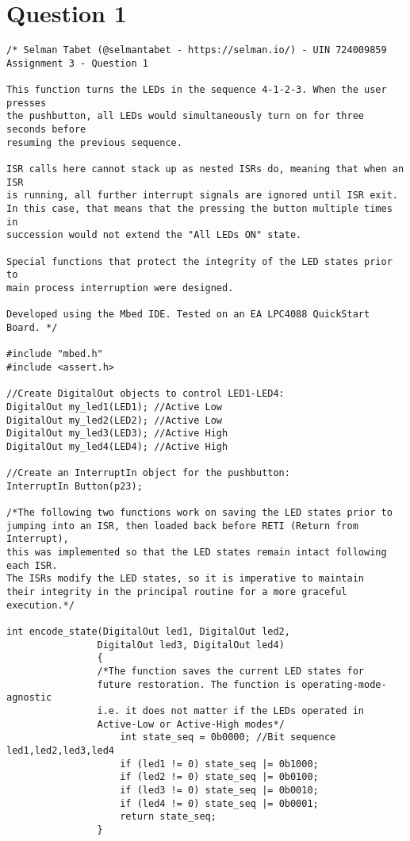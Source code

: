 \documentclass{article}
\begin{document}
\section*{Question 1}
\begin{verbatim}
/* Selman Tabet (@selmantabet - https://selman.io/) - UIN 724009859
Assignment 3 - Question 1

This function turns the LEDs in the sequence 4-1-2-3. When the user presses
the pushbutton, all LEDs would simultaneously turn on for three seconds before
resuming the previous sequence.

ISR calls here cannot stack up as nested ISRs do, meaning that when an ISR
is running, all further interrupt signals are ignored until ISR exit.
In this case, that means that the pressing the button multiple times in
succession would not extend the "All LEDs ON" state.

Special functions that protect the integrity of the LED states prior to
main process interruption were designed.

Developed using the Mbed IDE. Tested on an EA LPC4088 QuickStart Board. */

#include "mbed.h"
#include <assert.h>

//Create DigitalOut objects to control LED1-LED4:
DigitalOut my_led1(LED1); //Active Low
DigitalOut my_led2(LED2); //Active Low
DigitalOut my_led3(LED3); //Active High
DigitalOut my_led4(LED4); //Active High

//Create an InterruptIn object for the pushbutton:
InterruptIn Button(p23);

/*The following two functions work on saving the LED states prior to 
jumping into an ISR, then loaded back before RETI (Return from Interrupt),
this was implemented so that the LED states remain intact following each ISR.
The ISRs modify the LED states, so it is imperative to maintain
their integrity in the principal routine for a more graceful execution.*/

int encode_state(DigitalOut led1, DigitalOut led2, 
                DigitalOut led3, DigitalOut led4)
                {
                /*The function saves the current LED states for 
                future restoration. The function is operating-mode-agnostic
                i.e. it does not matter if the LEDs operated in
                Active-Low or Active-High modes*/
                    int state_seq = 0b0000; //Bit sequence led1,led2,led3,led4
                    if (led1 != 0) state_seq |= 0b1000;
                    if (led2 != 0) state_seq |= 0b0100;
                    if (led3 != 0) state_seq |= 0b0010;
                    if (led4 != 0) state_seq |= 0b0001;
                    return state_seq;
                }
                

\end{verbatim}
\end{document}
